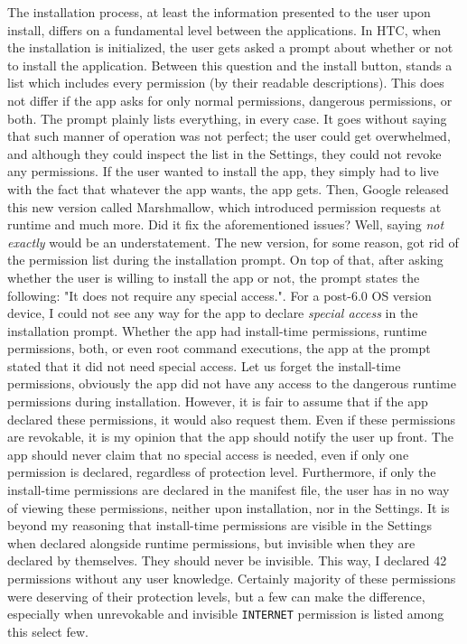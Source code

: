 \documentclass[
  a4paper,  %
  twoside,  %
  bibliography=totoc,
  headsepline,
  cleardoublepage=empty,
  parskip=half,
  draft=false,
  open=any
]{scrbook}
\begin{document}
The installation process, at least the information presented to the user upon install, differs on a fundamental level between the applications. In HTC, when the installation is initialized, the user gets asked a prompt about whether or not to install the application. Between this question and the install button, stands a list which includes every permission (by their readable descriptions). This does not differ if the app asks for only normal permissions, dangerous permissions, or both. The prompt plainly lists everything, in every case. It goes without saying that such manner of operation was not perfect; the user could get overwhelmed, and although they could inspect the list in the Settings, they could not revoke any permissions. If the user wanted to install the app, they simply had to live with the fact that whatever the app wants, the app gets. Then, Google released this new version called Marshmallow, which introduced permission requests at runtime and much more. Did it fix the aforementioned issues? Well, saying \textit{not exactly} would be an understatement. The new version, for some reason, got rid of the permission list during the installation prompt. On top of that, after asking whether the user is willing to install the app or not, the prompt states the following: "It does not require any special access.".  For a post-6.0 OS version device, I could not see any way for the app to declare \textit{special access} in the installation prompt. Whether the app had install-time permissions, runtime permissions, both, or even root command executions, the app at the prompt stated that it did not need special access. Let us forget the install-time permissions, obviously the app did not have any access to the dangerous runtime permissions during installation. However, it is fair to assume that if the app declared these permissions, it would also request them. Even if these permissions are revokable, it is my opinion that the app should notify the user up front. The app should never claim that no special access is needed, even if only one permission is declared, regardless of protection level. Furthermore, if only the install-time permissions are declared in the manifest file, the user has in no way of viewing these permissions, neither upon installation, nor in the Settings. It is beyond my reasoning that install-time permissions are visible in the Settings when declared alongside runtime permissions, but invisible when they are declared by themselves. They should never be invisible. This way, I declared 42 permissions without any user knowledge. Certainly majority of these permissions were deserving of their protection levels, but a few can make the difference, especially when unrevokable and invisible \texttt{INTERNET} permission is listed among this select few. 
\end{document}
